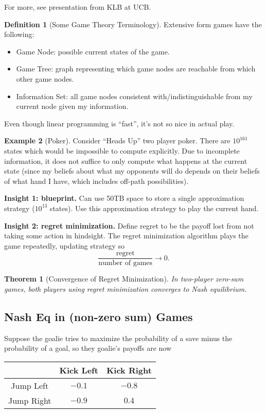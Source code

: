 \documentclass[dvipsnames]{article}
\newtheorem{theorem}{Theorem}[section]
\theoremstyle{definition}
\newtheorem{definition}{Definition}[section]
\newtheorem{example}[definition]{Example}
\theoremstyle{remark}
\begin{document}
For more, see presentation from KLB at UCB.


\begin{definition}[Some Game Theory Terminology]
	Extensive form games have the following:
	\begin{itemize}
		\item Game Node: possible current states of the game.
		\item Game Tree: graph representing which game nodes are reachable from which other game nodes. 
		\item Information Set: all game nodes consistent with/indistinguishable from my current node given my information.
	\end{itemize}
\end{definition}

Even though linear programming is ``fast'', it's not so nice in actual play.

\begin{example}[Poker]
	Consider ``Heads Up'' two player poker. There are $10^161$ states which would be impossible to compute explicitly. Due to incomplete information, it does not suffice to only compute what happens at the current state (since my beliefs about what my opponents will do depends on their beliefs of what hand I have, which includes off-path possibilities).
	
	\textbf{Insight 1: blueprint.} Can use 50TB space to store a single approximation strategy ($10^13$ states). Use this approximation strategy to play the current hand.
	
	\textbf{Insight 2: regret minimization.} Define regret to be the payoff lost from not taking some action in hindsight. The regret minimization algorithm plays the game repeatedly, updating strategy so 
	$$\frac{\text{regret}}{\text{number of games}} \to 0.$$
\end{example}

\begin{theorem}[Convergence of Regret Minimization]
	In two-player zero-sum games, both players using regret minimization converges to Nash equilibrium. 
\end{theorem}

\subsection{Nash Eq in (non-zero sum) Games}

Suppose the goalie tries to maximize the probability of a save minus the probability of a goal, so they goalie's payoffs are now
\begin{table}[h]\centering
	\begin{tabular}{c|c|c|}
		& Kick Left & Kick Right \\ \hline
		Jump Left & $-0.1$ & $-0.8$  \\ \hline
		Jump Right & $-0.9$ & $0.4$ \\ \hline
	\end{tabular}
\end{table}
\end{document}
